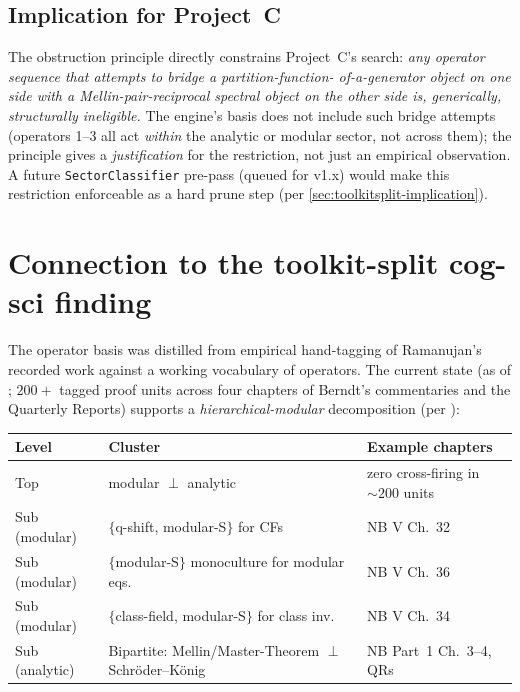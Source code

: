 \documentclass[11pt,reqno]{amsart}
\theoremstyle{definition}
\begin{document}
\subsection{Implication for Project~C}

The obstruction principle directly constrains Project~C's search:
\emph{any operator sequence that attempts to bridge a partition-function-
of-a-generator object on one side with a Mellin-pair-reciprocal
spectral object on the other side is, generically, structurally
ineligible.} The engine's basis does not include such bridge attempts
(operators 1--3 all act \emph{within} the analytic or modular
sector, not across them); the principle gives a \emph{justification}
for the restriction, not just an empirical observation. A future
\verb|SectorClassifier| pre-pass (queued for v1.x) would make this
restriction enforceable as a hard prune step (per
\cref{sec:toolkitsplit-implication}).

\section{Connection to the toolkit-split cog-sci finding}\label{sec:toolkitsplit}

The operator basis was distilled from empirical hand-tagging of
Ramanujan's recorded work against a working vocabulary of operators.
The current state (as of \cite[diary~36]{ProjectC}; $200+$ tagged
proof units across four chapters of Berndt's commentaries and the
Quarterly Reports) supports a \emph{hierarchical-modular}
decomposition (per \cite[\S D1]{ProjectC}):

\begin{center}
\small
\begin{tabular}{l l l}
\toprule
Level & Cluster & Example chapters \\
\midrule
Top            & modular $\perp$ analytic                       & zero cross-firing in $\sim 200$ units \\
Sub (modular)  & $\{$q-shift, modular-S$\}$ for CFs             & NB V Ch.~32 \\
Sub (modular)  & $\{$modular-S$\}$ monoculture for modular eqs. & NB V Ch.~36 \\
Sub (modular)  & $\{$class-field, modular-S$\}$ for class inv.  & NB V Ch.~34 \\
Sub (analytic) & Bipartite: Mellin/Master-Theorem $\perp$ Schr\"oder--K\"onig & NB Part~1 Ch.~3--4, QRs \\
\bottomrule
\end{tabular}
\end{center}
\end{document}
